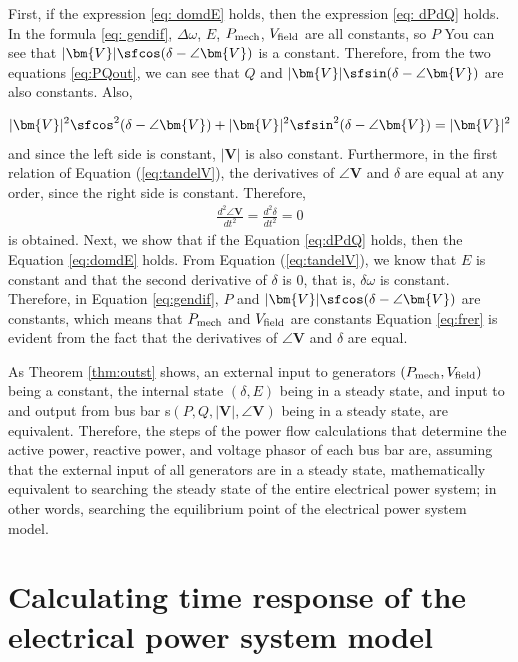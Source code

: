 \documentclass[tombow,dvipdfmx]{corona-a5-1.1}
\begin{document}
\begin{証明}
First, if the expression \ref{eq: domdE} holds, then the expression \ref{eq: dPdQ} holds.
In the formula \ref{eq: gendif}, $\Delta\omega $, $ E $, $ P_{\rm mech} $, $V_{\rm field} $ are all constants, so $ P $ You can see that $|\bm{V}|\sfcos(\delta-\angle\bm{V})$ is a constant.
Therefore, from the two equations \ref{eq:PQout}, we can see that $ Q $ and $ |\bm{V}|\sfsin(\delta-\angle\bm{V})$ are also constants.
Also,

\begin{align*}
|\bm{V}|^2\sfcos^2 (\delta - \angle \bm{V}) +
|\bm{V}|^2\sfsin^2 (\delta - \angle \bm{V}) = |\bm{V}|^2
\end{align*}
and since the left side is constant, $|\bm{V}|$ is also constant.
Furthermore, in the first relation of Equation (\ref{eq:tandelV}), the derivatives of $\angle \bm{V}$ and $\delta$ are equal at any order, since the right side is constant.
Therefore,
\begin{align*}
\frac{d^2 \angle \bm{V}}{dt^2} = \frac{d^2 \delta}{dt^2} =0
\end{align*}
is obtained.
Next, we show that if the Equation \ref{eq:dPdQ} holds, then the Equation \ref{eq:domdE} holds.
From Equation (\ref{eq:tandelV}), we know that $E$ is constant and that the second derivative of $\delta$ is $0$, that is, $\delta \omega$ is constant.
Therefore, in Equation \ref{eq:gendif}, $P$ and $|\bm{V}|\sfcos (\delta - \angle \bm{V})$ are constants, which means that $P_{\rm mech}$ and $V_{\rm field}$ are constants
Equation \ref{eq:frer} is evident from the fact that the derivatives of $\angle \bm{V}$ and $\delta$ are equal.
\end{証明}

As Theorem \ref{thm:outst} shows, an external input to generators $(P_{\rm mech},V_{\rm field})$ being a constant, the internal state $(\delta,E)$ being in a steady state, and input to and output from bus bar s$(P,Q,|\bm{V}|,\angle \bm{V})$ being in a steady state, are equivalent.
Therefore, the steps of the power flow calculations that determine the active power, reactive power, and voltage phasor of each bus bar are, assuming that the external input of all generators are in a steady state, mathematically equivalent to searching the steady state of the entire electrical power system; in other words, searching the equilibrium point of the electrical power system model.

\section{Calculating time response of the electrical power system model}\label{sec:numsimtr}
\end{document}
